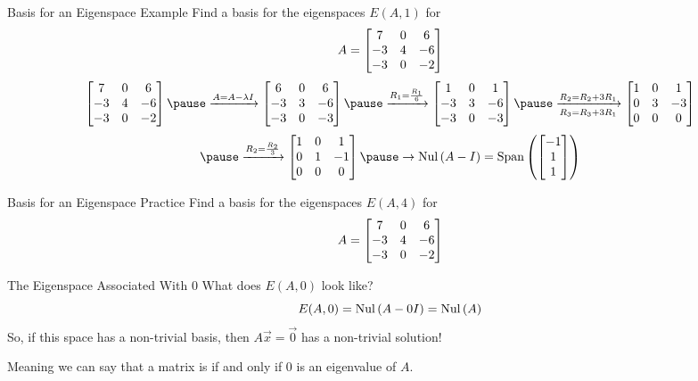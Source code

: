 \documentclass[xcoler=dvipsnames, aspectratio=169]{beamer}
\begin{document}
    \begin{frame}{Basis for an Eigenspace Example}
        Find a basis for the eigenspaces $E(A,1)$ for 
        \[
            A = \begin{bmatrix}
                7 & 0 & 6\\
                -3& 4 &-6\\
                -3& 0 &-2
            \end{bmatrix}
        \]\pause
        \[
            \bMat{
                7 & 0 & 6\\
                -3& 4 &-6\\
                -3& 0 &-2
            }\pause\xrightarrow{A=A-\lambda I}\bMat{
                6 & 0 & 6\\
                -3& 3 &-6\\
                -3& 0 &-3
            }\pause\xrightarrow{R_1 = \frac{R_1}{6}}\bMat{
                1 & 0 & 1\\
                -3& 3 &-6\\
                -3& 0 &-3
            }\pause\xrightarrow[R_3=R_3+3R_1]{R_2=R_2+3R_1}\bMat{
                1 & 0 & 1\\
                0 & 3 &-3\\
                0 & 0 & 0
            }
        \]
        \[
            \pause\xrightarrow{R_2=\frac{R_2}{3}}\bMat{
                1 & 0 & 1\\
                0 & 1 &-1\\
                0 & 0 & 0
            }\pause\rightarrow \nullS{A-I} = \Span{\bMat{-1\\1\\1}}
        \]
    \end{frame}
    \begin{frame}{Basis for an Eigenspace Practice}
        Find a basis for the eigenspaces $E(A,4)$ for 
        \[
            A = \begin{bmatrix}
                7 & 0 & 6\\
                -3& 4 &-6\\
                -3& 0 &-2
            \end{bmatrix}
        \]
        \iftoggle{showSolutions}{
            \pause
            \[
                E(A,4) = \Span{\bMat{-2\\0\\1}, \bMat{0\\1\\0}}
            \]
        }{\vspace{130pt}}
    \end{frame}
    \begin{frame}{The Eigenspace Associated With $0$}
        What does $E(A,0)$ look like?\pause
        \[
            E(A,0) = \mathrm{Nul}\left(A-0I\right) = \mathrm{Nul}\left(A\right)
        \]\pause
        So, if this space has a non-trivial basis, then $A\vec{x}=\vec{0}$ has a non-trivial solution!\pause

        Meaning we can say that a matrix is  if and only if $0$ is  an
        eigenvalue of $A$.
    \end{frame}
\end{document}
